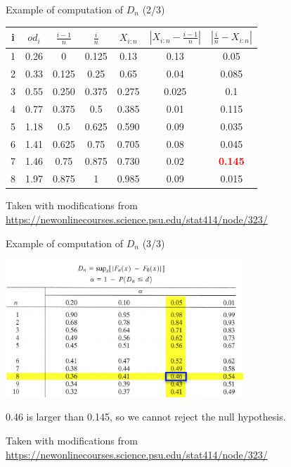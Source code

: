 \documentclass{beamer}
\begin{document}
\begin{frame}
{\centerline{Example of computation of $D_n$ (2/3)}}

\begin{center}
\begin{tabular}{|c|c|c|c|c|c|c|}
	\hline
	i & $od_i$ & $\frac{i-1}{n}$ & $\frac{i}{n}$ & $X_{i:n}$ & $|X_{i:n} - \frac{i-1}{n} |$ & $|\frac{i}{n} - X_{i:n}|$\\
	\hline
	1 & 0.26 & 0 & 0.125 & 0.13 & 0.13 & 0.05\\
	\hline
	2 & 0.33 & 0.125 & 0.25 & 0.65 & 0.04 & 0.085\\
	\hline
	3 & 0.55 & 0.250 & 0.375 & 0.275 & 0.025 & 0.1\\
	\hline
	4 & 0.77 & 0.375 & 0.5 & 0.385 & 0.01 & 0.115\\
	\hline
	5 & 1.18 & 0.5 & 0.625 & 0.590 & 0.09 & 0.035\\
	\hline
	6 & 1.41 & 0.625 & 0.75 & 0.705 & 0.08 & 0.045\\
	\hline
	7 & 1.46 & 0.75 & 0.875 & 0.730 & 0.02 & \textcolor{red}{\bf 0.145}\\
	\hline
	8 & 1.97 & 0.875 & 1 & 0.985 & 0.09 & 0.015\\

	\hline
\end{tabular}
\end{center}

\begin{center}
\tiny{Taken with modifications from \url{https://newonlinecourses.science.psu.edu/stat414/node/323/}}
\end{center}
\end{frame}

\begin{frame}
{\centerline{Example of computation of $D_n$ (3/3)}}

\begin{center}
\includegraphics[width=9cm]{P2023.AIBCCSS.InferenceAndLogisticRegression/TableKS.png}
\end{center}

0.46 is larger than 0.145, so we cannot reject the null hypothesis.

\begin{center}
\tiny{Taken with modifications from \url{https://newonlinecourses.science.psu.edu/stat414/node/323/}}
\end{center}
\end{frame}
\end{document}
